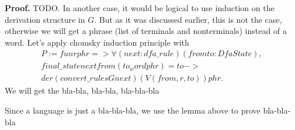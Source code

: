 \textbf{Proof.} TODO.
In another case, it would be logical to use induction on the derivation structure in $G$. But as it was discussed earlier, this is not the case, otherwise we will get a phrase (list of terminals and nonterminals) instead of a word. 
Let's apply chomsky induction principle with 
\begin{align*}
  P := fun r phr => \forall (next : dfa\_rule) (from to : DfaState), \\
           final\_state next from (to_word phr) = to -> \\
            der (convert\_rules G next) (V (from, r, to)) phr.
\end{align*}
We will get the bla-bla, bla-bla, bla-bla-bla         



Since a language is just a bla-bla-bla, we use the lemma above to prove bla-bla-bla












